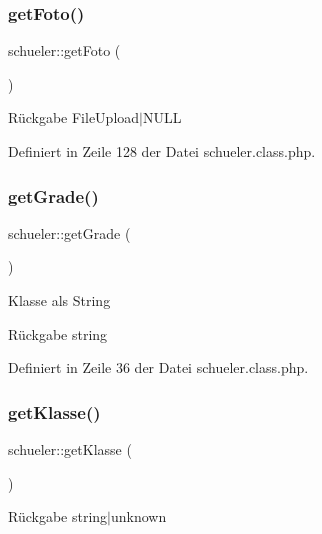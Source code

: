 \mbox{\label{classschueler_aac29c7a45ee69dc162e1f69300b2b709}} 
\subsubsection{\texorpdfstring{get\+Foto()}{getFoto()}}
{\footnotesize\ttfamily schueler\+::get\+Foto (\begin{DoxyParamCaption}{ }\end{DoxyParamCaption})}

\begin{DoxyReturn}{Rückgabe}
File\+Upload$\vert$\+N\+U\+LL 
\end{DoxyReturn}


Definiert in Zeile 128 der Datei schueler.\+class.\+php.

\mbox{\label{classschueler_aa967e04003ca82c4bca2631b2fe3c15b}} 
\subsubsection{\texorpdfstring{get\+Grade()}{getGrade()}}
{\footnotesize\ttfamily schueler\+::get\+Grade (\begin{DoxyParamCaption}{ }\end{DoxyParamCaption})}

Klasse als String \begin{DoxyReturn}{Rückgabe}
string 
\end{DoxyReturn}


Definiert in Zeile 36 der Datei schueler.\+class.\+php.

\mbox{\label{classschueler_a37dd121a898655df6e7965882e6f75d7}} 
\subsubsection{\texorpdfstring{get\+Klasse()}{getKlasse()}}
{\footnotesize\ttfamily schueler\+::get\+Klasse (\begin{DoxyParamCaption}{ }\end{DoxyParamCaption})}

\begin{DoxyReturn}{Rückgabe}
string$\vert$unknown 
\end{DoxyReturn}


